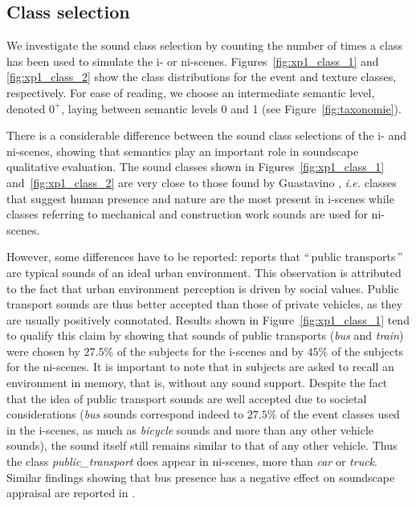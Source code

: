 \documentclass[twoside,twocolumn]{article}
\begin{document}
\subsection{Class selection}
\label{sec:classSelection}

We investigate the sound class selection by counting the number of times a class has been used to simulate the i- or ni-scenes. Figures~\ref{fig:xp1_class_1} and \ref{fig:xp1_class_2} show the class distributions for the event and texture classes, respectively. For ease of reading, we choose an intermediate semantic level, denoted $0^{+}$, laying between semantic levels 0 and 1 (see Figure~\ref{fig:taxonomie}).

There is a considerable difference between the sound class selections of the i- and ni-scenes, showing that semantics play an important role in soundscape qualitative evaluation. The sound classes shown in Figures~\ref{fig:xp1_class_1} and~\ref{fig:xp1_class_2} are very close to those found by Guastavino \cite{guastavino_ideal_2006}, \textit{i.e.} classes that suggest human presence and nature are the most present in i-scenes while classes referring to mechanical and construction work sounds are used for ni-scenes.

However, some differences have to be reported: \cite{guastavino_ideal_2006} reports that ``\,public transports\,'' are typical sounds of an ideal urban environment. This observation is attributed to the fact that urban environment perception is driven by social values. Public transport sounds are thus better accepted than those of private vehicles, as they are usually positively connotated. Results shown in Figure~\ref{fig:xp1_class_1} tend to qualify this claim  by showing that sounds of public transports (\textit{bus} and \textit{train}) were chosen by $27.5\%$ of the subjects for the i-scenes and by $45\%$ of the subjects for the ni-scenes. It is important to note that in \cite{guastavino_ideal_2006} subjects are asked to recall an environment in memory, that is, without any sound support. Despite the fact that the idea of public transport sounds are well accepted due to societal considerations (\textit{bus} sounds correspond indeed to $27.5\%$ of the event classes used in the i-scenes, as much as \textit{bicycle} sounds and more than any other vehicle sounds), the sound itself still remains similar to that of any other vehicle. Thus the class \textit{public\_transport} does appear in ni-scenes, more than \textit{car} or \textit{truck}. Similar findings showing that bus presence has a negative effect on soundscape appraisal are reported in \cite{lavandier2006contribution}.
\end{document}
